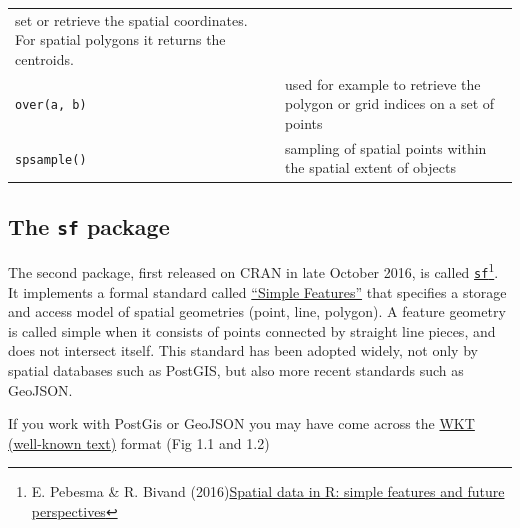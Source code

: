 \documentclass[]{book}
\let\rmarkdownfootnote\footnote%
\def\footnote{\protect\rmarkdownfootnote}
\begin{document}
\begin{longtable}[]{@{}ll@{}}
\begin{minipage}[t]{0.72\columnwidth}
set or retrieve the spatial coordinates. For spatial polygons it returns
the centroids.\strut
\end{minipage}\tabularnewline
\begin{minipage}[t]{0.17\columnwidth}\raggedright\strut
\texttt{over(a,\ b)}\strut
\end{minipage} & \begin{minipage}[t]{0.72\columnwidth}\raggedright\strut
used for example to retrieve the polygon or grid indices on a set of
points\strut
\end{minipage}\tabularnewline
\begin{minipage}[t]{0.17\columnwidth}\raggedright\strut
\texttt{spsample()}\strut
\end{minipage} & \begin{minipage}[t]{0.72\columnwidth}\raggedright\strut
sampling of spatial points within the spatial extent of objects\strut
\end{minipage}\tabularnewline
\bottomrule
\end{longtable}

\subsection{\texorpdfstring{The \texttt{sf}
package}{The sf package}}\label{the-sf-package}

The second package, first released on CRAN in late October 2016, is
called
\href{https://cran.r-project.org/package=sf}{\texttt{sf}}\footnote{E.
  Pebesma \& R. Bivand
  (2016)\href{http://pebesma.staff.ifgi.de/pebesma_sfr.pdf}{Spatial data
  in R: simple features and future perspectives}}. It implements a
formal standard called
\href{https://en.wikipedia.org/wiki/Simple_Features}{``Simple
Features''} that specifies a storage and access model of spatial
geometries (point, line, polygon). A feature geometry is called simple
when it consists of points connected by straight line pieces, and does
not intersect itself. This standard has been adopted widely, not only by
spatial databases such as PostGIS, but also more recent standards such
as GeoJSON.

If you work with PostGis or GeoJSON you may have come across the
\href{https://en.wikipedia.org/wiki/Well-known_text}{WKT (well-known
text)} format (Fig 1.1 and 1.2)
\end{document}
